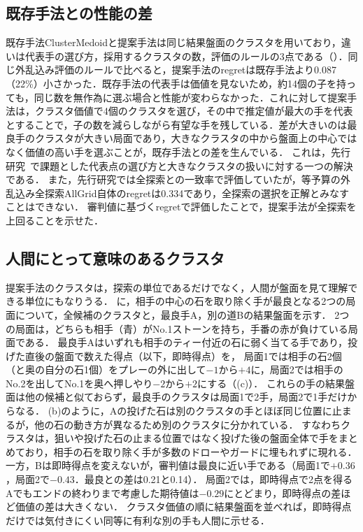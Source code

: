 \documentclass[submit]{ipsj}
\begin{document}
\subsection{既存手法との性能の差}
既存手法ClusterMedoidと提案手法は同じ結果盤面のクラスタを用いており，違いは代表手の選び方，採用するクラスタの数，評価のルールの3点である（）．同じ外乱込み評価のルールで比べると，提案手法のregretは既存手法より0.087（22\%）小さかった．既存手法の代表手は価値を見ないため，約14個の子を持っても，同じ数を無作為に選ぶ場合と性能が変わらなかった．これに対して提案手法は，クラスタ価値で4個のクラスタを選び，その中で推定値が最大の手を代表とすることで，子の数を減らしながら有望な手を残している．差が大きいのは最良手のクラスタが大きい局面であり，大きなクラスタの中から盤面上の中心ではなく価値の高い手を選ぶことが，既存手法との差を生んでいる．
これは，先行研究~\cite{naka_gi58}で課題とした代表点の選び方と大きなクラスタの扱いに対する一つの解決である．
また，先行研究では全探索との一致率で評価していたが，等予算の外乱込み全探索AllGrid自体のregretは0.334であり，全探索の選択を正解とみなすことはできない．
審判値に基づくregretで評価したことで，提案手法が全探索を上回ることを示せた．

\subsection{人間にとって意味のあるクラスタ}
提案手法のクラスタは，探索の単位であるだけでなく，人間が盤面を見て理解できる単位にもなりうる．
に，相手の中心の石を取り除く手が最良となる2つの局面について，全候補のクラスタと，最良手A，別の道Bの結果盤面を示す．
2つの局面は，どちらも相手（青）がNo.1ストーンを持ち，手番の赤が負けている局面である．
最良手Aはいずれも相手のティー付近の石に弱く当てる手であり，投げた直後の盤面で数えた得点（以下，即時得点）を，
局面1では相手の石2個（と奥の自分の石1個）をプレーの外に出して$-1$から$+4$に，局面2では相手のNo.2を出してNo.1を奥へ押しやり$-2$から$+2$にする（(c)）．
これらの手の結果盤面は他の候補と似ておらず，最良手のクラスタは局面1で2手，局面2で1手だけからなる．
(b)のように，Aの投げた石は別のクラスタの手とほぼ同じ位置に止まるが，他の石の動き方が異なるため別のクラスタに分かれている．
すなわちクラスタは，狙いや投げた石の止まる位置ではなく投げた後の盤面全体で手をまとめており，相手の石を取り除く手が多数のドローやガードに埋もれずに現れる．
一方，Bは即時得点を変えないが，審判値は最良に近い手である（局面1で$+0.36$，局面2で$-0.43$．最良との差は0.21と0.14）．
局面2では，即時得点で2点を得るAでもエンドの終わりまで考慮した期待値は$-0.29$にとどまり，即時得点の差ほど価値の差は大きくない．
クラスタ価値の順に結果盤面を並べれば，即時得点だけでは気付きにくい同等に有利な別の手も人間に示せる．
\end{document}
